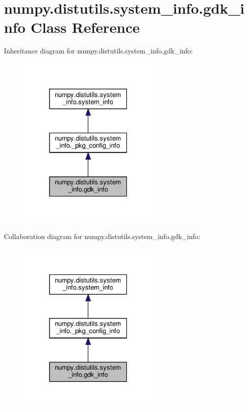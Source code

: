 \hypertarget{classnumpy_1_1distutils_1_1system__info_1_1gdk__info}{}\section{numpy.\+distutils.\+system\+\_\+info.\+gdk\+\_\+info Class Reference}
\label{classnumpy_1_1distutils_1_1system__info_1_1gdk__info}


Inheritance diagram for numpy.\+distutils.\+system\+\_\+info.\+gdk\+\_\+info\+:
\nopagebreak
\begin{figure}[H]
\begin{center}
\leavevmode
\includegraphics[width=198pt]{classnumpy_1_1distutils_1_1system__info_1_1gdk__info__inherit__graph}
\end{center}
\end{figure}


Collaboration diagram for numpy.\+distutils.\+system\+\_\+info.\+gdk\+\_\+info\+:
\nopagebreak
\begin{figure}[H]
\begin{center}
\leavevmode
\includegraphics[width=198pt]{classnumpy_1_1distutils_1_1system__info_1_1gdk__info__coll__graph}
\end{center}
\end{figure}
